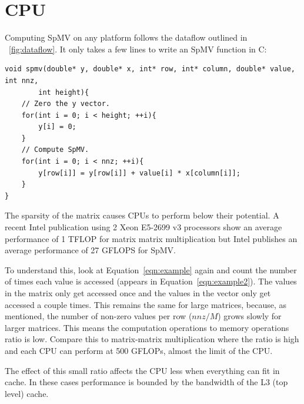 \section{CPU}
\label{sec:cpu}
Computing SpMV on any platform follows the dataflow outlined in \figurename~\ref{fig:dataflow}. It only takes a few lines to write an SpMV function in C:
\begin{verbatim}
void spmv(double* y, double* x, int* row, int* column, double* value, int nnz,
        int height){
    // Zero the y vector.
    for(int i = 0; i < height; ++i){
        y[i] = 0;
    }
    // Compute SpMV.
    for(int i = 0; i < nnz; ++i){
        y[row[i]] = y[row[i]] + value[i] * x[column[i]];
    }
}
\end{verbatim}
\par The sparsity of the matrix causes CPUs to perform below their potential. A recent Intel publication using 2 Xeon E5-2699 v3 processors show an average performance of 1 TFLOP for matrix matrix multiplication but Intel publishes an average performance of 27 GFLOPS for SpMV.
\par To understand this, look at Equation~\ref{eqn:example} again and count the number of times each value is accessed (appears in Equation~\ref{eqn:example2}). The values in the matrix only get accessed once and the values in the vector only get accessed a couple times. This remains the same for large matrices, because, as mentioned, the number of non-zero values per row ($nnz/M$) grows slowly for larger matrices. This means the computation operations to memory operations ratio is low. Compare this to matrix-matrix multiplication where the ratio is high and each CPU can perform at 500 GFLOPs, almost the limit of the CPU.
\par The effect of this small ratio affects the CPU less when everything can fit in cache. In these cases performance is bounded by the bandwidth of the L3 (top level) cache.

